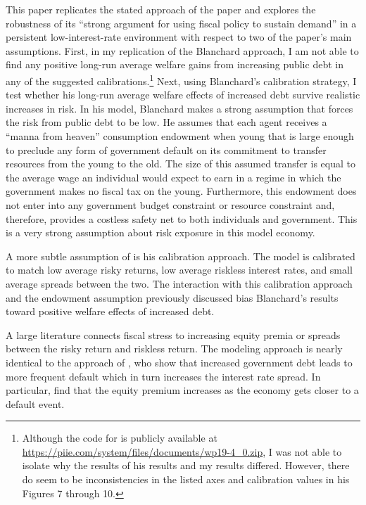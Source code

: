 \documentclass[letterpaper,12pt]{article}
\theoremstyle{definition}
\begin{document}
  This paper replicates the stated approach of the \citet{Blanchard:2019} paper and explores the robustness of its ``strong argument for using fiscal policy to sustain demand'' in a persistent low-interest-rate environment with respect to two of the paper's main assumptions. First, in my replication of the Blanchard approach, I am not able to find any positive long-run average welfare gains from increasing public debt in any of the suggested calibrations.\footnote{Although the code for \citet{Blanchard:2019} is publicly available at \href{https://piie.com/system/files/documents/wp19-4_0.zip}{https://piie.com/system/files/documents/wp19-4\_0.zip}, I was not able to isolate why the results of his results and my results differed. However, there do seem to be inconsistencies in the listed axes and calibration values in his Figures 7 through 10.} Next, using Blanchard's calibration strategy, I test whether his long-run average welfare effects of increased debt survive realistic increases in risk. In his model, Blanchard makes a strong assumption that forces the risk from public debt to be low. He assumes that each agent receives a ``manna from heaven'' consumption endowment when young that is large enough to preclude any form of government default on its commitment to transfer resources from the young to the old. The size of this assumed transfer is equal to the average wage an individual would expect to earn in a regime in which the government makes no fiscal tax on the young. Furthermore, this endowment does not enter into any government budget constraint or resource constraint and, therefore, provides a costless safety net to both individuals and government. This is a very strong assumption about risk exposure in this model economy.

  A more subtle assumption of \citet{Blanchard:2019} is his calibration approach. The model is calibrated to match low average risky returns, low average riskless interest rates, and small average spreads between the two. The interaction with this calibration approach and the endowment assumption previously discussed bias Blanchard's results toward positive welfare effects of increased debt.

  A large literature connects fiscal stress to increasing equity premia or spreads between the risky return and riskless return. The \citet{Blanchard:2019} modeling approach is nearly identical to the approach of \citet{EvansEtAl:2013}, who show that increased government debt leads to more frequent default which in turn increases the interest rate spread. In particular, \citet{EvansEtAl:2013} find that the equity premium increases as the economy gets closer to a default event.
\end{document}
